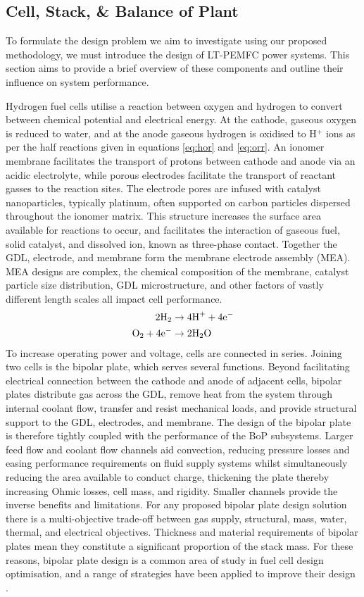 \subsection{Cell, Stack, \& Balance of Plant} \label{sec:design}
To formulate the design problem we aim to investigate using our proposed methodology, we must introduce the design of LT-PEMFC power systems. This section aims to provide a brief overview of these components and outline their influence on system performance.

Hydrogen fuel cells utilise a reaction between oxygen and hydrogen to convert between chemical potential and electrical energy.
At the cathode, gaseous oxygen is reduced to water, and at the anode gaseous hydrogen is oxidised to H$^+$ ions as per the half reactions given in equations \ref{eq:hor} and \ref{eq:orr}.
An ionomer membrane facilitates the transport of protons between cathode and anode via an acidic electrolyte, while porous electrodes facilitate the transport of reactant gasses to the reaction sites.
The electrode pores are infused with catalyst nanoparticles, typically platinum, often supported on carbon particles dispersed throughout the ionomer matrix.
This structure increases the surface area available for reactions to occur, and facilitates the interaction of gaseous fuel, solid catalyst, and dissolved ion, known as three-phase contact.
Together the GDL, electrode, and membrane form the membrane electrode assembly (MEA).
MEA designs are complex, the chemical composition of the membrane, catalyst particle size distribution, GDL microstructure, and other factors of vastly different length scales all impact cell performance.
\begin{align}
	2\text{H}_2             & \rightarrow 4 \text{H}^+ + 4 \text{e}^- \label{eq:hor} \\
	\text{O}_2 + 4\text{e}^- & \rightarrow 2\text{H}_2\text{O} \label{eq:orr}
\end{align}
To increase operating power and voltage, cells are connected in series.
Joining two cells is the bipolar plate, which serves several functions.
Beyond facilitating electrical connection between the cathode and anode of adjacent cells, bipolar plates distribute gas across the GDL, remove heat from the system through internal coolant flow, transfer and resist mechanical loads, and provide structural support to the GDL, electrodes, and membrane.
The design of the bipolar plate is therefore tightly coupled with the performance of the BoP subsystems.
Larger feed flow and coolant flow channels aid convection, reducing pressure losses and easing performance requirements on fluid supply systems whilst simultaneously reducing the area available to conduct charge, thickening the plate thereby increasing Ohmic losses, cell mass, and rigidity.
Smaller channels provide the inverse benefits and limitations.
For any proposed bipolar plate design solution there is a multi-objective trade-off between gas supply, structural, mass, water, thermal, and electrical objectives.
Thickness and material requirements of bipolar plates mean they constitute a significant proportion of the stack mass.
For these reasons, bipolar plate design is a common area of study in fuel cell design optimisation, and a range of strategies have been applied to improve their design \cite{liReviewBipolarPlates2005}.

